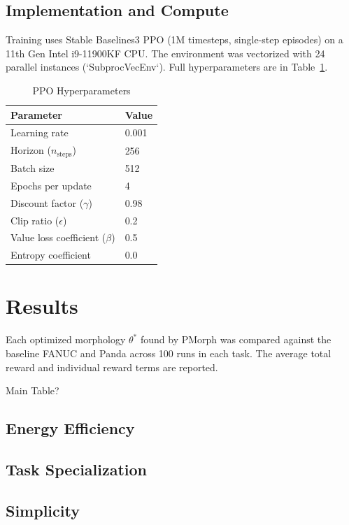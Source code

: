 \documentclass[letterpaper, 10 pt, conference]{ieeeconf}  %
\begin{document}
\subsection{Implementation and Compute}

Training uses Stable Baselines3 PPO (1M timesteps, single-step episodes) on a 11th Gen Intel i9-11900KF CPU. The environment was vectorized with 24 parallel instances (`SubprocVecEnv`). Full hyperparameters are in Table~\ref{tab:hyperparams}.

\begin{table}[H]
\caption{PPO Hyperparameters}
\label{tab:hyperparams}
\centering
\begin{tabular}{ll}
\hline
\textbf{Parameter} & \textbf{Value} \\
\hline
Learning rate & 0.001 \\
Horizon (\(n_\text{steps}\)) & 256 \\
Batch size & 512 \\
Epochs per update & 4 \\
Discount factor (\(\gamma\)) & 0.98 \\
Clip ratio (\(\epsilon\)) & 0.2 \\
Value loss coefficient (\(\beta\)) & 0.5 \\
Entropy coefficient & 0.0 \\
\hline
\end{tabular}
\end{table}

\section{Results}

Each optimized morphology \(\theta^*\) found by PMorph was compared against the baseline FANUC and Panda across 100 runs in each task.
The average total reward and individual reward terms are reported.

Main Table?

\subsection{Energy Efficiency}

\subsection{Task Specialization}

\subsection{Simplicity}
\end{document}
